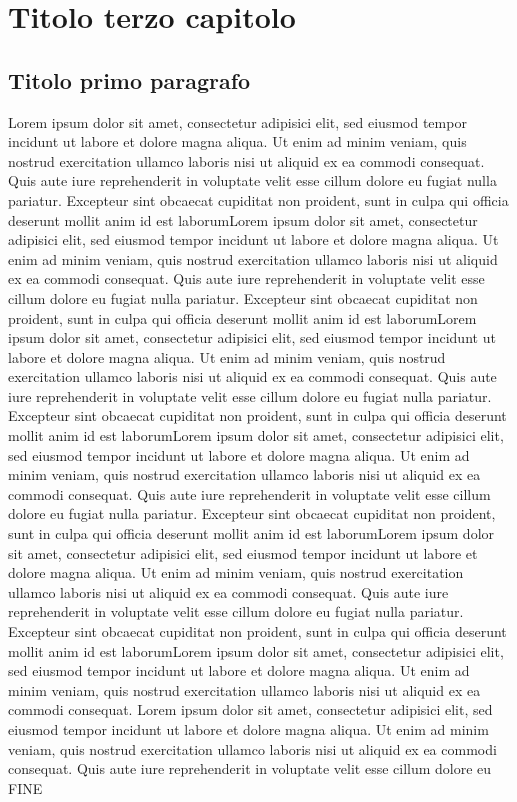 \chead{}
\chapter{Titolo terzo capitolo}




\section{Titolo primo paragrafo}

Lorem ipsum dolor sit amet, consectetur adipisici elit, sed eiusmod tempor incidunt ut labore et dolore magna aliqua. Ut enim ad minim veniam, quis nostrud exercitation ullamco laboris nisi ut aliquid ex ea commodi consequat. Quis aute iure reprehenderit in voluptate velit esse cillum dolore eu fugiat nulla pariatur. Excepteur sint obcaecat cupiditat non proident, sunt in culpa qui officia deserunt mollit anim id est laborumLorem ipsum dolor sit amet, consectetur adipisici elit, sed eiusmod tempor incidunt ut labore et dolore magna aliqua. Ut enim ad minim veniam, quis nostrud exercitation ullamco laboris nisi ut aliquid ex ea commodi consequat. Quis aute iure reprehenderit in voluptate velit esse cillum dolore eu fugiat nulla pariatur. Excepteur sint obcaecat cupiditat non proident, sunt in culpa qui officia deserunt mollit anim id est laborumLorem ipsum dolor sit amet, consectetur adipisici elit, sed eiusmod tempor incidunt ut labore et dolore magna aliqua. Ut enim ad minim veniam, quis nostrud exercitation ullamco laboris nisi ut aliquid ex ea commodi consequat. Quis aute iure reprehenderit in voluptate velit esse cillum dolore eu fugiat nulla pariatur. Excepteur sint obcaecat cupiditat non proident, sunt in culpa qui officia deserunt mollit anim id est laborumLorem ipsum dolor sit amet, consectetur adipisici elit, sed eiusmod tempor incidunt ut labore et dolore magna aliqua. Ut enim ad minim veniam, quis nostrud exercitation ullamco laboris nisi ut aliquid ex ea commodi consequat. Quis aute iure reprehenderit in voluptate velit esse cillum dolore eu fugiat nulla pariatur. Excepteur sint obcaecat cupiditat non proident, sunt in culpa qui officia deserunt mollit anim id est laborumLorem ipsum dolor sit amet, consectetur adipisici elit, sed eiusmod tempor incidunt ut labore et dolore magna aliqua. Ut enim ad minim veniam, quis nostrud exercitation ullamco laboris nisi ut aliquid ex ea commodi consequat. Quis aute iure reprehenderit in voluptate velit esse cillum dolore eu fugiat nulla pariatur. Excepteur sint obcaecat cupiditat non proident, sunt in culpa qui officia deserunt mollit anim id est laborumLorem ipsum dolor sit amet, consectetur adipisici elit, sed eiusmod tempor incidunt ut labore et dolore magna aliqua. Ut enim ad minim veniam, quis nostrud exercitation ullamco laboris nisi ut aliquid ex ea commodi consequat.  
Lorem ipsum dolor sit amet, consectetur adipisici elit, sed eiusmod tempor incidunt ut labore et dolore magna aliqua. Ut enim ad minim veniam, quis nostrud exercitation ullamco laboris nisi ut aliquid ex ea commodi consequat. Quis aute iure reprehenderit in voluptate velit esse cillum dolore eu FINE

